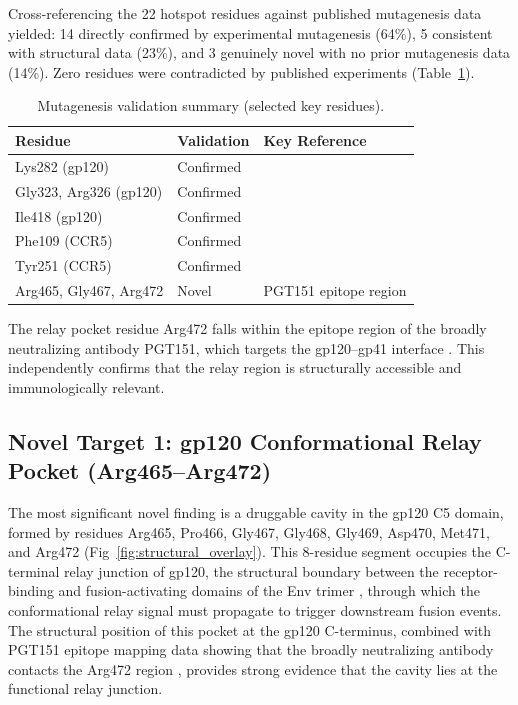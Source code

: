 \documentclass[11pt,a4paper]{article}
\begin{document}
Cross-referencing the 22 hotspot residues against published mutagenesis data yielded: 14 directly confirmed by experimental mutagenesis (64\%), 5 consistent with structural data (23\%), and 3 genuinely novel with no prior mutagenesis data (14\%). Zero residues were contradicted by published experiments (Table~\ref{tab:mutagenesis}).

\begin{table}[htbp]
\centering
\caption{Mutagenesis validation summary (selected key residues).}
\label{tab:mutagenesis}
\small
\begin{tabular}{@{}lll@{}}
\toprule
Residue & Validation & Key Reference \\
\midrule
Lys282 (gp120)              & Confirmed & \citep{Rizzuto1998} \\
Gly323, Arg326 (gp120)      & Confirmed & \citep{HuangCC2005} \\
Ile418 (gp120)               & Confirmed & \citep{Herschhorn2016} \\
Phe109 (CCR5)                & Confirmed & \citep{Tan2013} \\
Tyr251 (CCR5)                & Confirmed & \citep{Maeda2006} \\
Arg465, Gly467, Arg472       & Novel     & PGT151 epitope region \citep{Lee2016} \\
\bottomrule
\end{tabular}
\end{table}

The relay pocket residue Arg472 falls within the epitope region of the broadly neutralizing antibody PGT151, which targets the gp120--gp41 interface \citep{Lee2016,Blattner2014}. This independently confirms that the relay region is structurally accessible and immunologically relevant.

\subsection{Novel Target 1: gp120 Conformational Relay Pocket (Arg465--Arg472)}

The most significant novel finding is a druggable cavity in the gp120 C5 domain, formed by residues Arg465, Pro466, Gly467, Gly468, Gly469, Asp470, Met471, and Arg472 (Fig~\ref{fig:structural_overlay}). This 8-residue segment occupies the C-terminal relay junction of gp120, the structural boundary between the receptor-binding and fusion-activating domains of the Env trimer \citep{Pancera2010,Julien2013}, through which the conformational relay signal must propagate to trigger downstream fusion events. The structural position of this pocket at the gp120 C-terminus, combined with PGT151 epitope mapping data showing that the broadly neutralizing antibody contacts the Arg472 region \citep{Lee2016}, provides strong evidence that the cavity lies at the functional relay junction.
\end{document}
